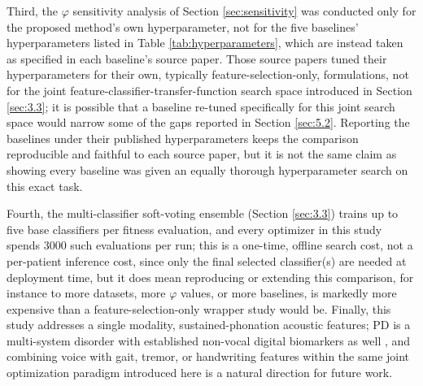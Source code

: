 Third, the $\varphi$ sensitivity analysis of Section \ref{sec:sensitivity} was conducted only for the proposed method's own hyperparameter, not for the five baselines' hyperparameters listed in Table \ref{tab:hyperparameters}, which are instead taken as specified in each baseline's source paper. Those source papers tuned their hyperparameters for their own, typically feature-selection-only, formulations, not for the joint feature-classifier-transfer-function search space introduced in Section \ref{sec:3.3}; it is possible that a baseline re-tuned specifically for this joint search space would narrow some of the gaps reported in Section \ref{sec:5.2}. Reporting the baselines under their published hyperparameters keeps the comparison reproducible and faithful to each source paper, but it is not the same claim as showing every baseline was given an equally thorough hyperparameter search on this exact task.

Fourth, the multi-classifier soft-voting ensemble (Section \ref{sec:3.3}) trains up to five base classifiers per fitness evaluation, and every optimizer in this study spends 3000 such evaluations per run; this is a one-time, offline search cost, not a per-patient inference cost, since only the final selected classifier(s) are needed at deployment time, but it does mean reproducing or extending this comparison, for instance to more datasets, more $\varphi$ values, or more baselines, is markedly more expensive than a feature-selection-only wrapper study would be. Finally, this study addresses a single modality, sustained-phonation acoustic features; PD is a multi-system disorder with established non-vocal digital biomarkers as well \cite{Sun:2024}, and combining voice with gait, tremor, or handwriting features within the same joint optimization paradigm introduced here is a natural direction for future work.
